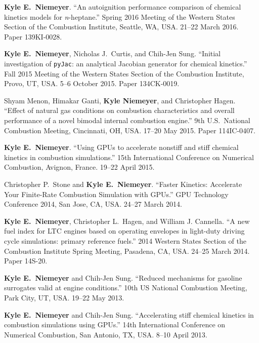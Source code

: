 \documentclass[margin,line,11pt]{res}
\makeatletter
\newlength{\bibhang}
\newlength{\bibsep}
 {\@listi \global\bibsep\itemsep \global\advance\bibsep by\parsep}
\newenvironment{bibenum*}
  {\renewcommand\labelenumi{\theenumi.}%
   \etaremune[
     topsep=0pt,
     itemsep=\bibsep,
     parsep=0pt,partopsep=0pt,
     itemindent=-\bibhang,
     leftmargin={\bibhang+\widthof{[999]}}]}
  {\endetaremune}
\makeatother
\begin{document}
\begin{resume}
\begin{bibenum*}
\item \textbf{Kyle E.\ Niemeyer}. ``An autoignition performance comparison of chemical kinetics models for \emph{n}-heptane.''
Spring 2016 Meeting of the Western States Section of the Combustion Institute, Seattle, WA, USA.
21--22 March 2016.
Paper 139KI-0028.

\item \textbf{Kyle E.\ Niemeyer}, Nicholas J.\ Curtis, and Chih-Jen Sung. ``Initial investigation of \texttt{pyJac}: an analytical Jacobian generator for chemical kinetics.''
Fall 2015 Meeting of the Western States Section of the Combustion Institute, Provo, UT, USA.
5--6 October 2015.
Paper 134CK-0019.

\item Shyam Menon, Himakar Ganti, \textbf{Kyle Niemeyer}, and Christopher Hagen.
``Effect of natural gas conditions on combustion characteristics and overall performance of a novel bimodal internal combustion engine.''
9th U.S.\ National Combustion Meeting, Cincinnati, OH, USA.
17--20 May 2015.
Paper 114IC-0407.

\item \textbf{Kyle E.\ Niemeyer}.
``Using GPUs to accelerate nonstiff and stiff chemical kinetics in combustion simulations.''
15th International Conference on Numerical Combustion, Avignon, France.
19--22 April 2015.

\item Christopher P.\ Stone and \textbf{Kyle E.\ Niemeyer}.
``Faster Kinetics: Accelerate Your Finite-Rate Combustion Simulation with GPUs.''
GPU Technology Conference 2014, San Jose, CA, USA.
24--27 March 2014.

\item \textbf{Kyle E.\ Niemeyer}, Christopher L.\ Hagen, and William J. Cannella.
``A new fuel index for LTC engines based on operating envelopes in light-duty driving cycle simulations: primary reference fuels.''
2014 Western States Section of the Combustion Institute Spring Meeting, Pasadena, CA, USA.
24--25 March 2014.
Paper 14S-20.

\item \textbf{Kyle E.\ Niemeyer} and Chih-Jen Sung.
``Reduced mechanisms for gasoline surrogates valid at engine conditions.''
10th US National Combustion Meeting, Park City, UT, USA.
19--22 May 2013.

\item \textbf{Kyle E.\ Niemeyer} and Chih-Jen Sung.
``Accelerating stiff chemical kinetics in combustion simulations using GPUs.''
14th International Conference on Numerical Combustion, San Antonio, TX, USA.
8--10 April 2013.


\end{bibenum*}
\end{resume}
\end{document}
